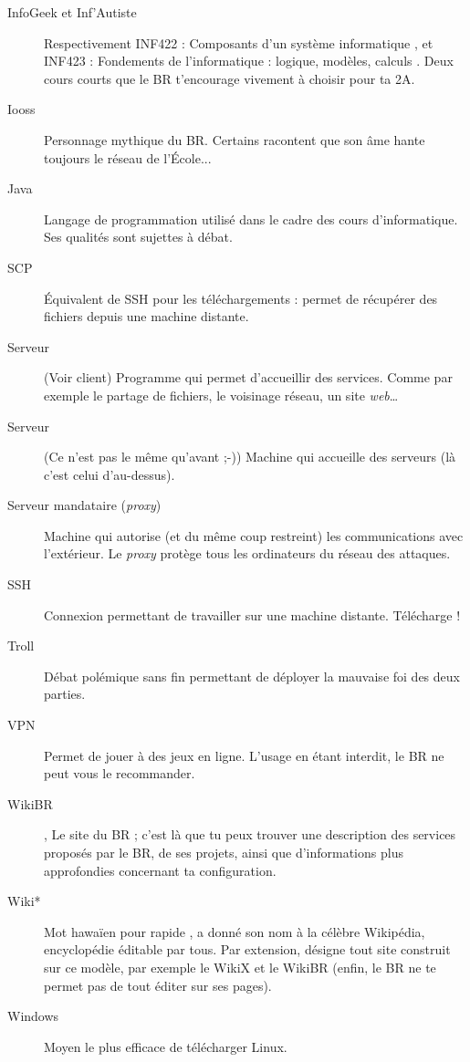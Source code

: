 \begin{description}
  \item[InfoGeek et Inf'Autiste] Respectivement INF422 : \og Composants d'un syst\`eme informatique \fg, et INF423 : \og Fondements de l'informatique : logique, mod\`eles, calculs \fg.
Deux cours courts que le BR t'encourage vivement \`a choisir pour ta 2A.

  \item[Iooss] Personnage mythique du BR. Certains racontent que son \^ame hante toujours le r\'eseau de l'\'Ecole...
  
   \item[Java] Langage de programmation utilis\'e dans le cadre des cours d'informatique. Ses qualit\'es sont sujettes \`a d\'ebat.
   
   
  \item[SCP] \'Equivalent de SSH pour les t\'el\'echargements : permet de r\'ecup\'erer des fichiers depuis une machine distante.
  
  \item[Serveur] (Voir client) Programme qui permet d'accueillir des services. Comme par exemple le partage de fichiers, le voisinage r\'eseau, un site \emph{web}\ldots\
  \item[Serveur] (Ce n'est pas le m\^eme qu'avant ;-)) Machine qui accueille des serveurs (l\`a c'est celui d'au-dessus).
  
  \item[Serveur mandataire (\emph{proxy})] Machine qui autorise
(et du m\^eme coup restreint) les communications avec l'ext\'erieur. Le \emph{proxy} prot\`ege tous les ordinateurs du r\'eseau des attaques.

  \item[SSH] Connexion permettant de travailler sur une machine distante. T\'el\'echarge  !
  
  \item[Troll] D\'ebat pol\'emique sans fin permettant de d\'eployer la mauvaise foi des deux parties.
  \item[VPN] Permet de jouer \`a des jeux en ligne. L'usage en \'etant interdit, le BR ne peut vous le recommander.
  
  \item[WikiBR] , Le site du BR ; c'est l\`a que tu peux trouver une description des services propos\'es par le BR, de ses projets, ainsi que
  d'informations plus approfondies concernant ta configuration.
  
  \item[Wiki*] Mot hawa\"ien pour \og rapide \fg, a donn\'e son nom \`a la c\'el\`ebre Wikip\'edia, encyclop\'edie \'editable par tous.
  Par extension, d\'esigne tout site construit sur ce mod\`ele, par exemple le WikiX et le WikiBR (enfin, le BR ne te permet pas de tout \'editer sur ses pages).
  \item[Windows] Moyen le plus efficace de t\'el\'echarger Linux.
\end{description}

